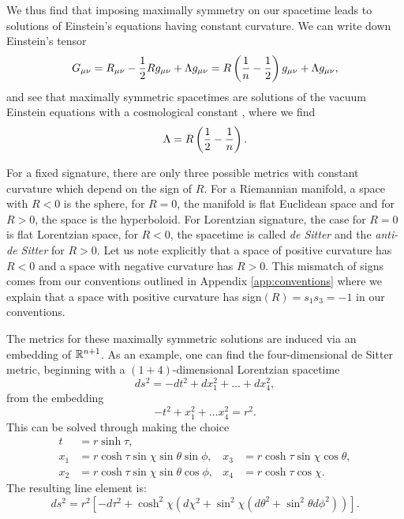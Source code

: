We thus find that imposing maximally symmetry on our spacetime leads to solutions of Einstein's equations having constant curvature. We can write down Einstein's tensor
\begin{equation*}
	G_{\mu \nu} = R_{\mu \nu} - \frac{1}{2} R g_{\mu \nu} + \Lambda g_{\mu \nu} = R \left(\frac1n - \frac{1}{2} \right) g_{\mu \nu} + \Lambda g_{\mu \nu},
\end{equation*}
and see that maximally symmetric spacetimes are solutions of the vacuum Einstein equations with a cosmological constant , where we find
\begin{equation*}
  \Lambda = R \left(\frac{1}{2} - \frac1n \right).
\end{equation*}

For a fixed signature, there are only three possible metrics with constant curvature which depend on the sign of $R$. For a Riemannian manifold, a space with $R < 0$ is the sphere, for $R = 0$, the manifold is flat Euclidean space and for $R > 0$, the space is the hyperboloid. For Lorentzian signature, the case for $R = 0$ is flat Lorentzian space, for $R < 0$, the spacetime is called \emph{de Sitter} and the \emph{anti-de Sitter} for $R > 0$. Let us note explicitly that a space of positive curvature has $R < 0$ and a space with negative curvature has $R > 0$. This mismatch of signs comes from our conventions outlined in Appendix \ref{app:conventions} where we explain that a space with positive curvature has sign$(R) = s_1 s_3 = -1$ in our conventions.

The metrics for these maximally symmetric solutions are induced via an embedding of ${\mathbb{R}}^{n+1}$. As an example, one can find the  four-dimensional de Sitter metric, beginning with a $(1+4)$-dimensional Lorentzian spacetime
\begin{equation*}
	ds^2 = -dt^2 + dx_1^2 +  \ldots + dx_4^2,
\end{equation*}
from the embedding
\begin{equation*}
	-t^2 + x_1^2 + \ldots x_4^2 = r^2.
\end{equation*}
This can be solved through making the choice
\begin{equation*}
	\begin{aligned}
		t &= r \sinh \tau, \\
		x_1 &= r \cosh \tau \sin \chi \sin \theta \sin \phi, & x_3 &= r \cosh \tau \sin \chi \cos \theta, \\
		x_2 &= r \cosh \tau \sin \chi \sin \theta \cos \phi, & x_4 &= r \cosh \tau \cos \chi.
	\end{aligned}
\end{equation*}
The resulting line element is:
\begin{equation*}
	ds^2 = r^2 \left[- d\tau^2 + \cosh^2 \chi \left(d\chi^2 + \sin^2 \chi \left(d\theta^2 + \sin^2\theta d\phi^2 \right) \right) \right].
\end{equation*}

